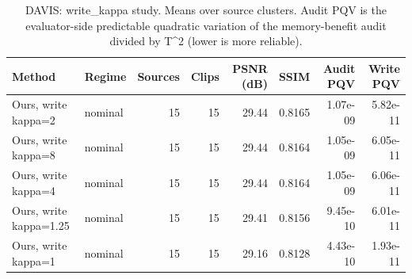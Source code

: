 \begin{table}[t]
\centering
\caption{DAVIS: write\_kappa study. Means over source clusters. Audit PQV is the evaluator-side predictable quadratic variation of the memory-benefit audit divided by T^2 (lower is more reliable).}
\label{tab:write_kappa_DAVIS}
\small
\begin{tabular}{llrrrrrr}
\toprule
Method & Regime & Sources & Clips & PSNR (dB) & SSIM & Audit PQV & Write PQV \\
\midrule
Ours, write kappa=2 & nominal & 15 & 15 & 29.44 & 0.8165 & 1.07e-09 & 5.82e-11 \\
Ours, write kappa=8 & nominal & 15 & 15 & 29.44 & 0.8164 & 1.05e-09 & 6.05e-11 \\
Ours, write kappa=4 & nominal & 15 & 15 & 29.44 & 0.8164 & 1.05e-09 & 6.06e-11 \\
Ours, write kappa=1.25 & nominal & 15 & 15 & 29.41 & 0.8156 & 9.45e-10 & 6.01e-11 \\
Ours, write kappa=1 & nominal & 15 & 15 & 29.16 & 0.8128 & 4.43e-10 & 1.93e-11 \\
\bottomrule
\end{tabular}
\end{table}
